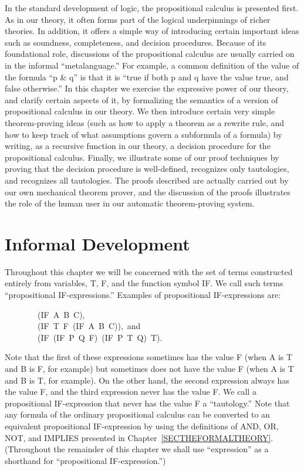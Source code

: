 \documentclass[10pt]{book}
\newenvironment{pubasis}{\begin{flushleft}}{\end{flushleft}}
\begin{document}
In the standard development of logic, the propositional calculus
is presented first.  As in our theory, it often forms part of the
logical underpinnings of richer theories.  In addition, it offers
a simple way of introducing certain important ideas such as soundness,
completeness, and decision procedures.
Because of its foundational role, discussions of
the propositional calculus are usually carried on in the informal
``metalanguage.''  For example, a common definition of the value of
the formula ``p \& q'' is that it is ``true if both p and q have the value
true, and false otherwise.''  In this chapter we exercise
the expressive power of our theory, and clarify certain aspects of it,
by formalizing the semantics of a version of propositional calculus in our theory.
We then introduce certain very simple theorem-proving ideas (such as
how to apply a theorem as a rewrite rule, and how to
keep track of what assumptions govern a subformula of a formula) by
writing, as a recursive function in our theory, a decision procedure
for the propositional calculus.  Finally, we illustrate some of our proof
techniques by proving that the decision procedure is well-defined,
recognizes only tautologies, and recognizes all tautologies.
The proofs described are actually carried out by our own mechanical theorem
prover, and the discussion of the proofs illustrates the role of the human
user in our automatic theorem-proving system.

\section{Informal Development}
Throughout this chapter we will be concerned with
the set of terms constructed entirely from variables, T, F,
and the function symbol IF.  We call such terms ``propositional
IF-expressions.''  Examples of propositional IF-expressions are:
\begin{pubasis}
~~~~~~~~(IF~A~B~C),\\

~~~~~~~~(IF~T~F~(IF~A~B~C)),~and\\

~~~~~~~~(IF~(IF~P~Q~F)~(IF~P~T~Q)~T).\\
\end{pubasis}
Note that the first of these expressions sometimes has the value F
(when A is T and B is F, for example) but sometimes does not have the value F
(when A is T and B is T, for example).  On the other hand, the
second expression always has the value F, and the third expression
never has the value F.  We  call a propositional IF-expression that never
has the value F a ``tautology.''  Note that any  formula of the ordinary propositional calculus can
be converted to an equivalent propositional IF-expression 
by using the definitions of AND, OR, NOT, and IMPLIES
presented in Chapter~\ref{SECTHEFORMALTHEORY}.
(Throughout the remainder of this chapter
we shall use ``expression'' as a shorthand for ``propositional IF-expression.'')
\end{document}

